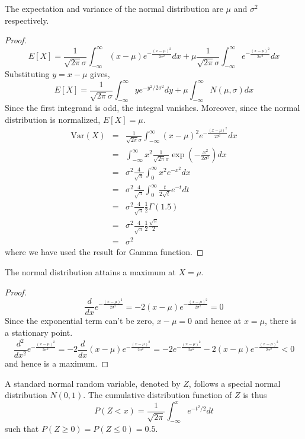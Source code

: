 \documentclass[a4paper]{article}
\begin{document}
\begin{thm}
The expectation and variance of the normal distribution are $\mu$ and $\sigma^2$ respectively.
\end{thm}
\begin{proof}
$$E[X]=\frac{1}{\sqrt{2\pi}\sigma}\int_{-\infty}^\infty (x-\mu)e^{-\frac{(x-\mu)^2}{2\sigma^2}}dx+\mu\frac{1}{\sqrt{2\pi}\sigma}\int_{-\infty}^\infty e^{-\frac{(x-\mu)^2}{2\sigma^2}}dx$$
Substituting $y=x-\mu$ gives,
$$E[X]=\frac{1}{\sqrt{2\pi}\sigma}\int_{-\infty}^\infty ye^{-y^2/2\sigma^2}dy+\mu\int_{-\infty}^\infty N(\mu,\sigma)dx$$
Since the first integrand is odd, the integral vanishes. Moreover, since the normal distribution is normalized, $E[X]=\mu$.
\begin{eqnarray}
\text{Var}(X)&=&\frac{1}{\sqrt{2\pi}\sigma}\int_{-\infty}^\infty (x-\mu)^2e^{-\frac{(x-\mu)^2}{2\sigma^2}}dx\nonumber\\&=&\int_{-\infty}^\infty x^2\frac{1}{\sqrt{2\pi}\sigma}\exp(-\frac{x^2}{2\sigma^2})dx\nonumber\\&=&\sigma^2\frac{4}{\sqrt{\pi}}\int_0^\infty x^2e^{-x^2}dx\nonumber\\&=&\sigma^2\frac{4}{\sqrt{\pi}}\int_0^\infty \frac{t}{2\sqrt{t}}e^{-t}dt\nonumber\\&=&\sigma^2\frac{4}{\sqrt{\pi}}\frac{1}{2}\Gamma(1.5)\nonumber\\&=&\sigma^2\frac{4}{\sqrt{\pi}}\frac{1}{2}\frac{\sqrt{\pi}}{2}\nonumber\\&=&\sigma^2\nonumber
\end{eqnarray}
where we have used the result for Gamma function.
\end{proof}
\begin{cor}
The normal distribution attains a maximum at $X=\mu$.
\end{cor}
\begin{proof}
$$\frac{d}{dx}e^{-\frac{(x-\mu)^2}{2\sigma^2}}=-2(x-\mu)e^{-\frac{(x-\mu)^2}{2\sigma^2}}=0$$
Since the exponential term can't be zero, $x-\mu=0$ and hence at $x=\mu$, there is a stationary point.
$$\frac{d^2}{dx^2}e^{-\frac{(x-\mu)^2}{2\sigma^2}}=-2\frac{d}{dx}(x-\mu)e^{-\frac{(x-\mu)^2}{2\sigma^2}}=-2e^{-\frac{(x-\mu)^2}{2\sigma^2}}-2(x-\mu)e^{{-\frac{(x-\mu)^2}{2\sigma^2}}}<0$$
and hence is a maximum.
\end{proof}
\begin{defi}
A standard normal random variable, denoted by $Z$, follows a special normal distribution $N(0,1)$. The cumulative distribution function of $Z$ is thus
$$P(Z<x)=\frac{1}{\sqrt{2\pi}}\int_{-\infty}^xe^{-t^2/2}dt$$
such that $P(Z\geq0)=P(Z\leq 0)=0.5$.
\end{defi}
\end{document}
